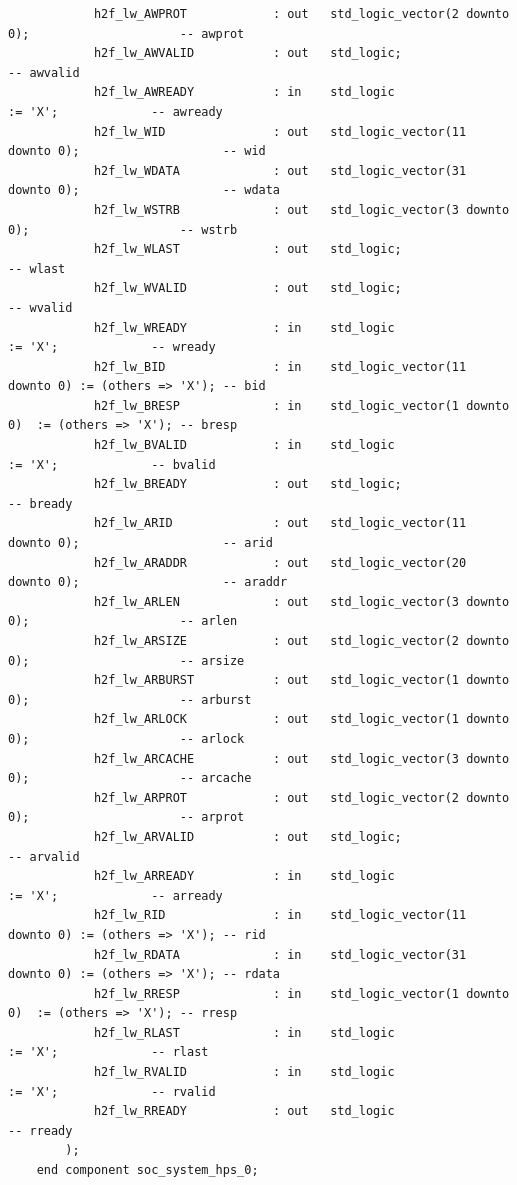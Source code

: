 \documentclass[conference]{IEEEtran}
\begin{document}
\begin{lstlisting}
			h2f_lw_AWPROT            : out   std_logic_vector(2 downto 0);                     -- awprot
			h2f_lw_AWVALID           : out   std_logic;                                        -- awvalid
			h2f_lw_AWREADY           : in    std_logic                     := 'X';             -- awready
			h2f_lw_WID               : out   std_logic_vector(11 downto 0);                    -- wid
			h2f_lw_WDATA             : out   std_logic_vector(31 downto 0);                    -- wdata
			h2f_lw_WSTRB             : out   std_logic_vector(3 downto 0);                     -- wstrb
			h2f_lw_WLAST             : out   std_logic;                                        -- wlast
			h2f_lw_WVALID            : out   std_logic;                                        -- wvalid
			h2f_lw_WREADY            : in    std_logic                     := 'X';             -- wready
			h2f_lw_BID               : in    std_logic_vector(11 downto 0) := (others => 'X'); -- bid
			h2f_lw_BRESP             : in    std_logic_vector(1 downto 0)  := (others => 'X'); -- bresp
			h2f_lw_BVALID            : in    std_logic                     := 'X';             -- bvalid
			h2f_lw_BREADY            : out   std_logic;                                        -- bready
			h2f_lw_ARID              : out   std_logic_vector(11 downto 0);                    -- arid
			h2f_lw_ARADDR            : out   std_logic_vector(20 downto 0);                    -- araddr
			h2f_lw_ARLEN             : out   std_logic_vector(3 downto 0);                     -- arlen
			h2f_lw_ARSIZE            : out   std_logic_vector(2 downto 0);                     -- arsize
			h2f_lw_ARBURST           : out   std_logic_vector(1 downto 0);                     -- arburst
			h2f_lw_ARLOCK            : out   std_logic_vector(1 downto 0);                     -- arlock
			h2f_lw_ARCACHE           : out   std_logic_vector(3 downto 0);                     -- arcache
			h2f_lw_ARPROT            : out   std_logic_vector(2 downto 0);                     -- arprot
			h2f_lw_ARVALID           : out   std_logic;                                        -- arvalid
			h2f_lw_ARREADY           : in    std_logic                     := 'X';             -- arready
			h2f_lw_RID               : in    std_logic_vector(11 downto 0) := (others => 'X'); -- rid
			h2f_lw_RDATA             : in    std_logic_vector(31 downto 0) := (others => 'X'); -- rdata
			h2f_lw_RRESP             : in    std_logic_vector(1 downto 0)  := (others => 'X'); -- rresp
			h2f_lw_RLAST             : in    std_logic                     := 'X';             -- rlast
			h2f_lw_RVALID            : in    std_logic                     := 'X';             -- rvalid
			h2f_lw_RREADY            : out   std_logic                                         -- rready
		);
	end component soc_system_hps_0;


\end{lstlisting}
\end{document}
